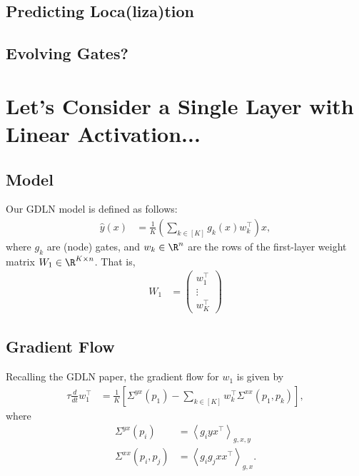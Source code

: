 \documentclass{article}
\begin{document}
\subsection{Predicting Loca(liza)tion}

\subsection{Evolving Gates?}


\section{Let's Consider a Single Layer with Linear Activation...}

\subsection{Model}
Our GDLN model is defined as follows:
\begin{align}
  \hat{y}(x) &= \frac{1}{K} \left( \sum_{k \in [K]} g_k(x) w_k^\top \right) x, \label{eq:gdln_model}
\end{align}
where $g_k$ are (node) gates, and $w_k \in \R^n$ are the rows of the first-layer weight matrix $W_1 \in \R^{K \times n}$.
That is,
\begin{align}
  W_1 &= \begin{pmatrix} w_1^\top \\ \vdots \\ w_K^\top \end{pmatrix}
\end{align}

\subsection{Gradient Flow}
Recalling the GDLN paper, the gradient flow for $w_1$ is given by
\begin{align}
  \tau \frac{d}{dt} w_1^\top &= \frac{1}{K} \left[ \Sigma^{yx}(p_1) - \sum_{k \in [K]} w_k^\top \Sigma^{xx}(p_1,p_k) \right], \label{eq:grad_flow}
\end{align}
where
\begin{align}
  \Sigma^{yx}(p_i) &= \left\langle g_i y x^\top \right\rangle_{g,x,y} \\
  \Sigma^{xx}(p_i,p_j) &= \left\langle g_i g_j x x^\top \right\rangle_{g,x}.
\end{align}
\end{document}
